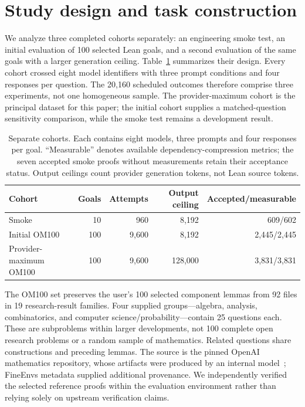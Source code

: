 \section{Study design and task construction}
\label{sec:methods-design}

We analyze three completed cohorts separately: an engineering smoke test, an initial evaluation of 100 selected Lean goals, and a second evaluation of the same goals with a larger generation ceiling. Table~\ref{tab:methods-cohorts} summarizes their design. Every cohort crossed eight model identifiers with three prompt conditions and four responses per question. The 20,160 scheduled outcomes therefore comprise three experiments, not one homogeneous sample. The provider-maximum cohort is the principal dataset for this paper; the initial cohort supplies a matched-question sensitivity comparison, while the smoke test remains a development result.

\begin{table}[tbp]
\centering
\small
\begin{tabular}{lrrrr}
\hline
Cohort & Goals & Attempts & Output ceiling & Accepted/measurable \\
\hline
Smoke & 10 & 960 & 8,192 & 609/602 \\
Initial OM100 & 100 & 9,600 & 8,192 & 2,445/2,445 \\
Provider-maximum OM100 & 100 & 9,600 & 128,000 & 3,831/3,831 \\
\hline
\end{tabular}
\caption{Separate cohorts. Each contains eight models, three prompts and four responses per goal. ``Measurable'' denotes available dependency-compression metrics; the seven accepted smoke proofs without measurements retain their acceptance status. Output ceilings count provider generation tokens, not Lean source tokens.}
\label{tab:methods-cohorts}
\end{table}

The OM100 set preserves the user's 100 selected component lemmas from 92 files in 19 research-result families. Four supplied groups---algebra, analysis, combinatorics, and computer science/probability---contain 25 questions each. These are subproblems within larger developments, not 100 complete open research problems or a random sample of mathematics. Related questions share constructions and preceding lemmas. The source is the pinned OpenAI mathematics repository, whose artifacts were produced by an internal model~\cite{openaimath}; FineEnvs metadata supplied additional provenance. We independently verified the selected reference proofs within the evaluation environment rather than relying solely on upstream verification claims.

